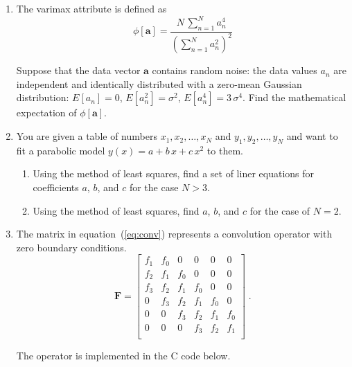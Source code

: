 \begin{enumerate}

\item The varimax attribute is defined as
\begin{equation}
  \label{eq:varimax}
\phi[\mathbf{a}] = \frac{\displaystyle N\,\sum\limits_{n=1}^N
  a_n^4}{\displaystyle \left(\sum\limits_{n=1}^{N} a_n^2\right)^2}
\end{equation}

Suppose that the data vector $\mathbf{a}$ contains random noise:
the data values $a_n$ are independent and identically distributed with
a zero-mean Gaussian distribution: $E[a_n]=0$, $E[a_n^2]=\sigma^2$,
$E[a_n^4]=3\,\sigma^4$. Find the mathematical expectation of
$\phi[\mathbf{a}]$.

\item You are given a table of numbers $x_1, x_2, \ldots, x_N$ and $y_1, y_2, \ldots, y_N$ and 
want to fit a parabolic model $y(x) = a + b\,x + c\,x^2$ to them.

\begin{enumerate}
\item Using the method of least squares, find a set of liner equations
  for coefficients $a$, $b$, and $c$ for the case $N > 3$.
\item Using the method of least squares, find $a$, $b$, and $c$ for the case of $N=2$.
\end{enumerate}

\item The matrix in equation~(\ref{eq:conv}) represents a convolution operator with zero boundary conditions.
\begin{equation}
\label{eq:conv}
\mathbf{F} = \left[\begin{array}{llllll}
f_1 & f_0 & 0   & 0   & 0   & 0   \\
f_2 & f_1 & f_0 & 0   & 0   & 0   \\
f_3 & f_2 & f_1 & f_0 & 0   & 0   \\
0   & f_3 & f_2 & f_1 & f_0 & 0   \\
0   & 0   & f_3 & f_2 & f_1 & f_0 \\
0   & 0   & 0   & f_3 & f_2 & f_1 \\
\end{array}\right]\;.
\end{equation}

The operator is implemented in the C code below.

\lstset{language=c,numbers=left,numberstyle=\tiny,showstringspaces=false}



\end{enumerate}
